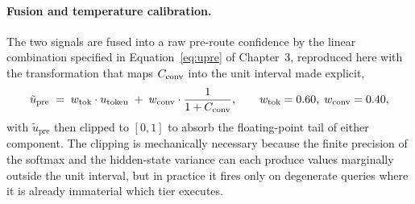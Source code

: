 \paragraph{Fusion and temperature calibration.}
The two signals are fused into a raw pre-route confidence by the linear combination specified in Equation~\ref{eq:upre} of Chapter~3, reproduced here with the transformation that maps $C_{\text{conv}}$ into the unit interval made explicit,
\begin{equation}
\tilde{u}_{\text{pre}} \;=\; w_{\text{tok}} \cdot u_{\text{token}} \;+\; w_{\text{conv}} \cdot \frac{1}{1 + C_{\text{conv}}}, \qquad w_{\text{tok}} = 0.60,\; w_{\text{conv}} = 0.40,
\label{eq:upre-raw}
\end{equation}
with $\tilde{u}_{\text{pre}}$ then clipped to $[0,1]$ to absorb the floating-point tail of either component. The clipping is mechanically necessary because the finite precision of the softmax and the hidden-state variance can each produce values marginally outside the unit interval, but in practice it fires only on degenerate queries where it is already immaterial which tier executes.


